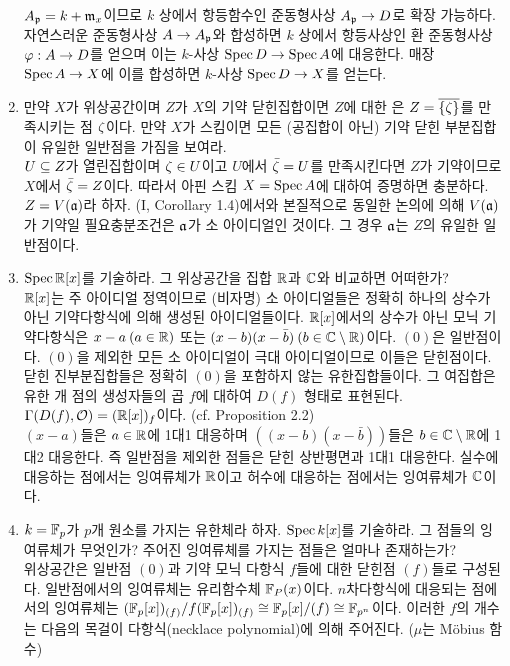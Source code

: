 \begin{enumerate}[label=\tb{2.\arabic*.},itemindent=0mm,itemsep=4mm]
	$A_{\mathfrak{p}}=k+\mathfrak{m}_x$이므로 $k$ 상에서 항등함수인 준동형사상 $A_{\mathfrak{p}}\rightarrow D$로 확장 가능하다.
	자연스러운 준동형사상 $A\rightarrow A_{\mathfrak{p}}$와 합성하면 $k$ 상에서 항등사상인 환 준동형사상 $\varphi:A\rightarrow D$를 얻으며
	이는 $k$-사상 $\operatorname{Spec} D\rightarrow\operatorname{Spec} A$에 대응한다. 매장 $\operatorname{Spec} A\rightarrow X$에 이를 합성하면 $k$-사상 $\operatorname{Spec} D\rightarrow X$를 얻는다.
	\item 만약 $X$가 위상공간이며 $Z$가 $X$의 기약 닫힌집합이면 $Z$에 대한 은
	$Z=\overline{\{\zeta\}}$를 만족시키는 점 $\zeta$이다.
	만약 $X$가 스킴이면 모든 (공집합이 아닌) 기약 닫힌 부분집합이 유일한 일반점을 가짐을 보여라.\\
	\sol $U\subseteq Z$가 열린집합이며 $\zeta\in U$이고 $U$에서 $\bar{\zeta}=U$를 만족시킨다면 $Z$가 기약이므로 $X$에서 $\bar{\zeta}=Z$이다.
	따라서 아핀 스킴 $X=\operatorname{Spec} A$에 대하여 증명하면 충분하다. $Z=V(\mathfrak{a})$라 하자.
	(I, Corollary 1.4)에서와 본질적으로 동일한 논의에 의해 $V(\mathfrak{a})$가 기약일 필요충분조건은 $\mathfrak{a}$가 소 아이디얼인 것이다.
	그 경우 $\mathfrak{a}$는 $Z$의 유일한 일반점이다.
	\item $\operatorname{Spec}\mathbb R[x]$를 기술하라. 그 위상공간을 집합 $\mathbb R$과 $\mathbb C$와 비교하면 어떠한가?\\
	\sol $\mathbb R[x]$는 주 아이디얼 정역이므로 (비자명) 소 아이디얼들은 정확히 하나의 상수가 아닌 기약다항식에 의해 생성된 아이디얼들이다.
	$\mathbb R[x]$에서의 상수가 아닌 모닉 기약다항식은 $x-a\:(a\in\mathbb R)$ 또는 $(x-b)(x-\bar b)\:(b\in\mathbb C\setminus\mathbb R)$이다.
	$(0)$은 일반점이다. $(0)$을 제외한 모든 소 아이디얼이 극대 아이디얼이므로 이들은 닫힌점이다.
	닫힌 진부분집합들은 정확히 $(0)$을 포함하지 않는 유한집합들이다.
	그 여집합은 유한 개 점의 생성자들의 곱 $f$에 대하여 $D(f)$ 형태로 표현된다.
	$\Gamma(D(f),\mathcal{O})=(\mathbb R[x])_f$이다. (cf. Proposition 2.2)\\
	$(x-a)$들은 $a\in\mathbb R$에 1대1 대응하며 $((x-b)(x-\bar b))$들은 $b\in\mathbb C\setminus\mathbb R$에 1대2 대응한다.
	즉 일반점을 제외한 점들은 닫힌 상반평면과 1대1 대응한다.
	실수에 대응하는 점에서는 잉여류체가 $\mathbb R$이고 허수에 대응하는 점에서는 잉여류체가 $\mathbb C$이다.
	\item $k=\mathbb{F}_p$가 $p$개 원소를 가지는 유한체라 하자. $\operatorname{Spec} k[x]$를 기술하라. 그 점들의 잉여류체가 무엇인가?
	주어진 잉여류체를 가지는 점들은 얼마나 존재하는가?\\
	\sol 위상공간은 일반점 $(0)$과 기약 모닉 다항식 $f$들에 대한 닫힌점 $(f)$들로 구성된다.
	일반점에서의 잉여류체는 유리함수체 $\mathbb{F}_P(x)$이다.
	$n$차다항식에 대응되는 점에서의 잉여류체는 $(\mathbb{F}_p[x])_{(f)}/f(\mathbb{F}_p[x])_{(f)}\cong\mathbb{F}_p[x]/(f)\cong\mathbb{F}_{p^n}$이다.
	이러한 $f$의 개수는 다음의 목걸이 다항식(necklace polynomial)에 의해 주어진다. ($\mu$는 M\"obius 함수)

\end{enumerate}
